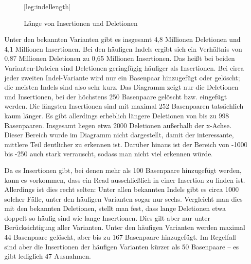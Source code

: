 \begin{figure}[htbp]
\pgfplotsset{footnotesize,width=12cm,compat=1.8}
\begin{center}
\ref*{leg:indellength}

\end{center}

\caption{Länge von Insertionen und Deletionen}
\label{fig:stats:indellength}

\end{figure}

Unter den bekannten Varianten gibt es insgesamt 4,8 Millionen Deletionen und 4,1 Millionen Insertionen. Bei den häufigen Indels ergibt sich ein Verhältnis von 0,87 Millionen Deletionen zu 0,65 Millionen Insertionen. Das heißt bei beiden Varianten-Dateien sind Deletionen geringfügig häufiger als Insertionen. Bei circa jeder zweiten Indel-Variante wird nur ein Basenpaar hinzugefügt oder gelöscht; die meisten Indels sind also sehr kurz. Das Diagramm zeigt nur die Deletionen und Insertionen, bei der höchstens 250 Basenpaare gelöscht bzw. eingefügt werden. Die längsten Insertionen sind mit maximal 252 Basenpaaren tatsächlich kaum länger. Es gibt allerdings erheblich längere Deletionen von bis zu 998 Basenpaaren. Insgesamt liegen etwa 2000 Deletionen außerhalb der x-Achse. Dieser Bereich wurde im Diagramm nicht dargestellt, damit der interessante, mittlere Teil deutlicher zu erkennen ist. Darüber hinaus ist der Bereich von -1000 bis -250 auch stark verrauscht, sodass man nicht viel erkennen würde.

Da es Insertionen gibt, bei denen mehr als 100 Basenpaare hinzugefügt werden, kann es vorkommen, dass ein Read ausschließlich in einer Insertion zu finden ist. Allerdings ist dies recht selten: Unter allen bekannten Indels gibt es circa 1000 solcher Fälle, unter den häufigen Varianten sogar nur sechs. Vergleicht man dies mit den bekannten Deletionen, stellt man fest, dass lange Deletionen etwa doppelt so häufig sind wie lange Insertionen. Dies gilt aber nur unter Berücksichtigung aller Varianten. Unter den häufigen Varianten werden maximal 44 Basenpaare gelöscht, aber bis zu 167 Basenpaare hinzugefügt. Im Regelfall sind aber die Insertionen der häufigen Varianten kürzer als 50 Basenpaare -- es gibt lediglich 47 Ausnahmen.
